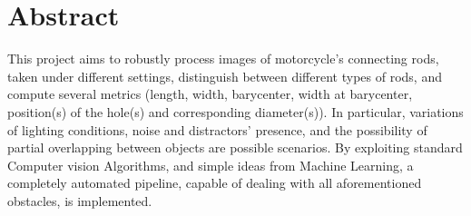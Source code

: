 \chapter*{Abstract} 
This project aims to robustly process images of motorcycle's connecting rods, 
taken under different settings, distinguish between different types of rods, 
and compute several metrics (length, width, barycenter, width at barycenter, 
position(s) of the hole(s) and corresponding diameter(s)).
In particular, variations of lighting conditions, noise and distractors' presence, 
and the possibility of partial overlapping between objects are possible scenarios.
By exploiting standard Computer vision Algorithms, and simple ideas from Machine Learning, 
a completely automated pipeline, capable of dealing with all aforementioned obstacles, is implemented.